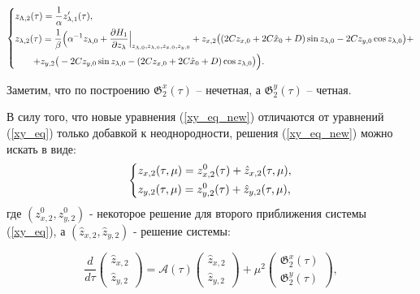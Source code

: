 \begin{equation*}
    \begin{dcases}
        z_{\Lambda,2}(\tau) = \frac{1}{\alpha} z_{\lambda,1}'(\tau), \\
        z_{\lambda,2}(\tau) = \frac1\beta \Big( \alpha^{-1} z_{\lambda,0} + \frac{\partial H_1}{\partial z_\lambda} \Big|_{z_{\Lambda,0},z_{\lambda,0},z_{x,0},z_{y,0}} +z_{x,2} \big( (2C z_{x,0}+2C \hat x_0+D) \sin z_{\lambda,0} - 2C z_{y,0} \cos z_{\lambda,0} \big) + \\ \qquad
+ z_{y,2} \big( -2C z_{y,0} \sin z_{\lambda,0} - (2C z_{x,0}+2C \hat x_0+D) \cos z_{\lambda,0} \big) \Big).\\
    \end{dcases}
\end{equation*}
\endgroup

Заметим, что по построению $\mathfrak{G}_2^x(\tau)$ -- нечетная, а $\mathfrak{G}_2^y(\tau)$ -- четная.

В силу того, что новые уравнения (\ref{xy_eq_new}) отличаются от уравнений (\ref{xy_eq}) только добавкой к неоднородности, решения (\ref{xy_eq_new}) можно искать в виде:
\begin{equation*}
    \begin{dcases}
        z_{x,2}(\tau,\mu) = z_{x,2}^0(\tau) + \hat z_{x,2}(\tau, \mu), \\
        z_{y,2}(\tau,\mu) = z_{y,2}^0(\tau) + \hat z_{y,2}(\tau, \mu),
    \end{dcases}
\end{equation*}
где $(z_{x,2}^0, z_{y,2}^0)$ - некоторое решение для второго приближения системы (\ref{xy_eq}), а $(\hat z_{x,2},\hat z_{y,2})$ - решение системы:

\begin{equation*}
\frac{d}{d\tau} \begin{pmatrix} \hat z_{x,2} \\ \hat z_{y,2} \end{pmatrix} = 
\mathcal{A}(\tau) \begin{pmatrix} \hat z_{x,2} \\ \hat z_{y,2} \end{pmatrix} +  
\mu^2 \begin{pmatrix} 
\mathfrak{G}_2^x(\tau) \\ 
\mathfrak{G}_2^y(\tau)
\end{pmatrix},
\label{xy_eq_new2}
\end{equation*}

